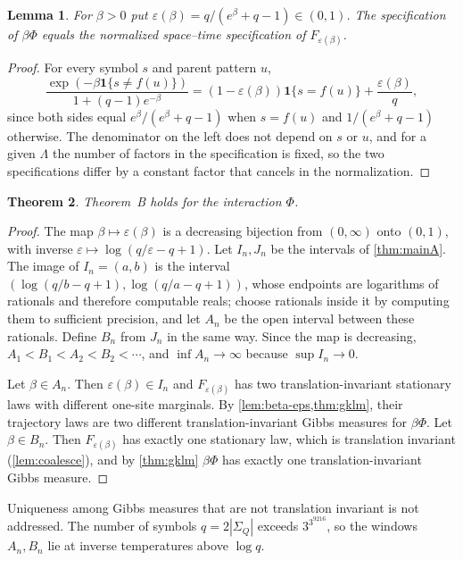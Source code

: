 \documentclass[11pt]{article}
\theoremstyle{plain}
\newtheorem{theorem}{Theorem}[section]
\newtheorem{lemma}[theorem]{Lemma}
\theoremstyle{definition}
\theoremstyle{remark}
\newcommand{\eps}{\varepsilon}
\newcommand{\ind}{\mathbf 1}
\newcommand{\SigQ}{\Sigma_Q}
\begin{document}
\begin{lemma}\label{lem:beta-eps}
For $\beta>0$ put $\eps(\beta)=q/(e^\beta+q-1)\in(0,1)$. The specification of $\beta\Phi$ equals the normalized space--time specification of $F_{\eps(\beta)}$.
\end{lemma}

\begin{proof}
For every symbol $s$ and parent pattern $u$,
\[
\frac{\exp(-\beta\ind\{s\ne f(u)\})}{1+(q-1)e^{-\beta}}=(1-\eps(\beta))\ind\{s=f(u)\}+\frac{\eps(\beta)}q ,
\]
since both sides equal $e^\beta/(e^\beta+q-1)$ when $s=f(u)$ and $1/(e^\beta+q-1)$ otherwise. The denominator on the left does not depend on $s$ or $u$, and for a given $\Lambda$ the number of factors in the specification is fixed, so the two specifications differ by a constant factor that cancels in the normalization.
\end{proof}

\begin{theorem}\label{thm:mainB}
Theorem~B holds for the interaction $\Phi$.
\end{theorem}

\begin{proof}
The map $\beta\mapsto\eps(\beta)$ is a decreasing bijection from $(0,\infty)$ onto $(0,1)$, with inverse $\eps\mapsto\log(q/\eps-q+1)$. Let $I_n,J_n$ be the intervals of \cref{thm:mainA}. The image of $I_n=(a,b)$ is the interval $(\log(q/b-q+1),\log(q/a-q+1))$, whose endpoints are logarithms of rationals and therefore computable reals; choose rationals inside it by computing them to sufficient precision, and let $A_n$ be the open interval between these rationals. Define $B_n$ from $J_n$ in the same way. Since the map is decreasing, $A_1<B_1<A_2<B_2<\cdots$, and $\inf A_n\to\infty$ because $\sup I_n\to0$.

Let $\beta\in A_n$. Then $\eps(\beta)\in I_n$ and $F_{\eps(\beta)}$ has two translation-invariant stationary laws with different one-site marginals. By \cref{lem:beta-eps,thm:gklm}, their trajectory laws are two different translation-invariant Gibbs measures for $\beta\Phi$. Let $\beta\in B_n$. Then $F_{\eps(\beta)}$ has exactly one stationary law, which is translation invariant (\cref{lem:coalesce}), and by \cref{thm:gklm} $\beta\Phi$ has exactly one translation-invariant Gibbs measure.
\end{proof}

Uniqueness among Gibbs measures that are not translation invariant is not addressed. The number of symbols $q=2|\SigQ|$ exceeds $3^{3^{9216}}$, so the windows $A_n,B_n$ lie at inverse temperatures above $\log q$.
\end{document}
